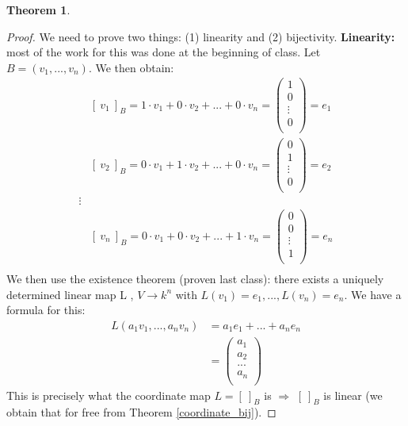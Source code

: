 \documentclass[a4paper, 12pt]{article}
\newtheorem{theorem}{Theorem}
\theoremstyle{definition}
\theoremstyle{definition}
\theoremstyle{definition}
\theoremstyle{definition}
\begin{document}
{\begin{theorem}
\end{theorem} 
\begin{proof}
	We need to prove two things: (1) linearity and (2) bijectivity. 
	\newline
	\newline
	\textbf{Linearity:} most of the work for this was done at the beginning of class. Let $B = (v_1, ..., v_n)$. We then obtain: 
	\begin{align*}
		& [\ v_1\ ]_B = 1 \cdot v_1 + 0 \cdot v_2 + ... + 0 \cdot v_n = \begin{pmatrix}
			1 \\ 
			0 \\
			\vdots \\
			0 \\ 
		\end{pmatrix} = e_1 \\
		& [\ v_2\ ]_B = 0 \cdot v_1 + 1 \cdot v_2 + ... + 0 \cdot v_n = \begin{pmatrix}
			0 \\ 
			1 \\
			\vdots \\
			0 \\ 
		\end{pmatrix} = e_2 \\
		\vdots \\
		& [\ v_n\ ]_B = 0 \cdot v_1 + 0 \cdot v_2 + ... + 1 \cdot v_n = \begin{pmatrix}
			0 \\ 
			0 \\
			\vdots \\
			1 \\ 
		\end{pmatrix} = e_n \\	
	\end{align*}
We then use the existence theorem (proven last class): there exists a uniquely determined linear map L , $V \rightarrow k^n$ with $L(v_1) = e_1,..., L(v_n) = e_n$. We have a formula for this: 
\begin{align*}
	L( a_1 v_1, ..., a_n v_n) & = a_1 e_1 + ... + a_n e_n  \\
	& = \begin{pmatrix}
		a_1 \\
		a_2 \\
		... \\
		a_n \\ 
	\end{pmatrix}
\end{align*}
	This is precisely what the coordinate map $L = [\ ]_B$ is $\Rightarrow$ $[\ ]_B$ is linear (we obtain that for free from Theorem \ref{coordinate_bij}). 

\end{proof}}
\end{document}
